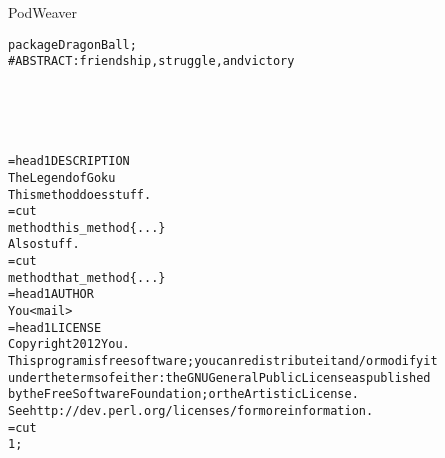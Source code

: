 \documentclass[serif,14pt,color=usenames,dvipsnames]{beamer}
\begin{document}
\begin{frame}{PodWeaver}        %
\begin{alltt}
\tiny
package DragonBall;\\
\# ABSTRACT: friendship, struggle, and victory\\
~\\
~\\
~\\
~\\
~\\
=head1 DESCRIPTION\\
The Legend of Goku\\
This method does stuff.\\
=cut\\
method this\_method \{ ... \}\\
Also stuff.\\
=cut\\
method that\_method \{ ... \}\\
=head1 AUTHOR\\
You <mail>\\
=head1 LICENSE\\
Copyright 2012 You.\\
This program is free software; you can redistribute it and/or modify it
under the terms of either: the GNU General Public License as published
by the Free Software Foundation; or the Artistic License.\\
See http://dev.perl.org/licenses/ for more information.\\
=cut\\
1;\\
\end{alltt}
\end{frame}
\end{document}
